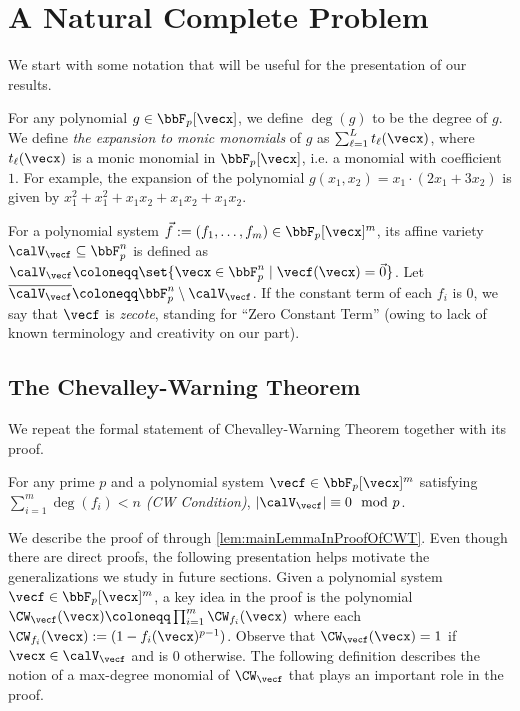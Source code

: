 \setcounter{section}{3}
\setcounter{theorem}{12}
\section{A Natural Complete Problem}
\label{sec:chevalley}





We start with some notation that will be useful for the
presentation of our results.
\smallskip

 For any polynomial $g \in \bbF_p[\vecx]$, we
define $\deg(g)$ to be the degree of $g$. We define
\textit{the expansion to monic monomials} of $g$ as $\sum_{\ell = 1}^L t_{\ell}(\vecx)$, 
where $t_{\ell}(\vecx)$ is a monic monomial in
$\bbF_p[\vecx]$, i.e. a monomial with coefficient $1$. For example,
the expansion of the polynomial
$g(x_1, x_2) = x_1 \cdot (2 x_1 + 3 x_2)$ is
given by $x_1^2 + x_1^2 + x_1 x_2 + x_1 x_2 + x_1 x_2$.

For a polynomial system $\vec{f} := (f_1, \ldots, f_m) \in \bbF_p[\vecx]^m$, its affine variety $\calV_{\vecf} \subseteq \bbF_p^n$ is defined as
$\calV_{\vecf} \coloneqq \set{\vecx \in \bbF_p^n \mid \vecf(\vecx) = \vec{0}}$.
Let $\overline{\calV_{\vecf}} \coloneqq \bbF_p^n \setminus \calV_{\vecf}$. If the constant term of each $f_i$ is $0$, we say that $\vecf$ is {\em zecote}, standing for ``Zero Constant Term'' (owing to lack of known terminology and creativity on our part).

  
\subsection{The Chevalley-Warning Theorem} \label{sec:ChevalleyWarningProof}

  We repeat the formal statement of Chevalley-Warning Theorem together with its
proof.

\begin{cwthm}[\cite{r15,r37}]
    For any prime $p$ and a polynomial system
  $\vecf \in \bbF_p[\vecx]^m$ satisfying $\sum_{i = 1}^m \deg(f_i) < n$
  \emph{(CW Condition)}, $|\calV_{\vecf}| \equiv 0 \mod{p}$.
\end{cwthm}

  We describe the proof of \CWT through \autoref{lem:mainLemmaInProofOfCWT}.
Even though there are direct proofs, the following presentation helps motivate the generalizations we study in future sections. Given a polynomial system $\vecf \in
\bbF_p[\vecx]^m$, a key idea in the proof is the polynomial $\CW_{\vecf}(\vecx)
\coloneqq \prod_{i = 1}^m \CW_{f_i}(\vecx)$ where each $\CW_{f_i}(\vecx) := (1 - f_i(\vecx)^{p - 1})$. Observe that $\CW_{\vecf}(\vecx) = 1$ if
$\vecx \in \calV_{\vecf}$ and is $0$ otherwise. The following definition
describes the notion of a max-degree monomial of $\CW_{\vecf}$ that plays an important role in the proof.

